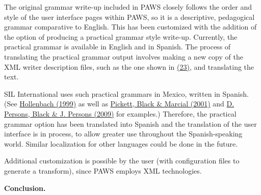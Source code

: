 \documentclass[12pt]{article}
\begin{document}
The original grammar write-up included in PAWS closely follows the order and style of the user interface pages within PAWS, so it is a descriptive, pedagogical grammar comparative to English. This has been customized with the addition of the option of producing a practical grammar style write-up. Currently, the practical grammar is available in English and in Spanish. The process of translating the practical grammar output involves making a new copy of the XML writer description files, such as the one shown in \hyperlink{xPossessorPracticalWriter}{(23)}, and translating the text.\par{}\indent SIL International uses such practical grammars in Mexico, written in Spanish. (See \hyperlink{rHollenbach}{Hollenbach (1999)} as well as \hyperlink{rPickettBlackMarcial}{Pickett, Black \& Marcial (2001)} and \hyperlink{rPersonsBlack}{D. Persons, Black \& J. Persons (2009)} for examples.) Therefore, the practical grammar option has been translated into Spanish and the translation of the user interface is in process, to allow greater use throughout the Spanish-speaking world. Similar localization for other languages could be done in the future.\par{}\indent Additional customization is possible by the user (with configuration files to generate a transform), since PAWS employs XML technologies.\par{}\vspace{.25in}\noindent\protect\hypertarget{sConc}{{\noindent
\textbf{{ }}}}{\noindent
\textbf{{\protect\noindent
Conclusion. }}}
\end{document}
